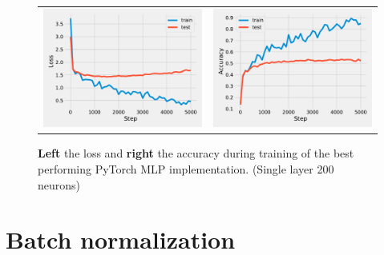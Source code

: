 \documentclass{article}
\newcommand\·{\ensuremath{\cdot}}
\newcommand\…{\ensuremath{\dots}}
\newcommand{\⇔}{\ensuremath{\iff}}
\newcommand{\⇐}{\ensuremath{\impliedby}}
\newcommand{\⇒}{\ensuremath{\implies}}
\newcommand\1{\ensuremath{\mathds{1}}}
\newcommand\ℝ{\ensuremath{\mathds{R}}}
\begin{document}
\begin{figure}
  \begin{tabularx}{\linewidth}{XX}
    \includegraphics[width=\linewidth]{assignment_1/code/torch_loss.pdf} &
    \includegraphics[width=\linewidth]{assignment_1/code/torch_accuracy.pdf}
  \end{tabularx}
  \caption{\textbf{Left} the loss and \textbf{right} the accuracy during training of the best performing PyTorch MLP implementation. (Single layer 200 neurons)}
  \label{fig:pytorch_mlp}
\end{figure}

\section{Batch normalization}
\end{document}
